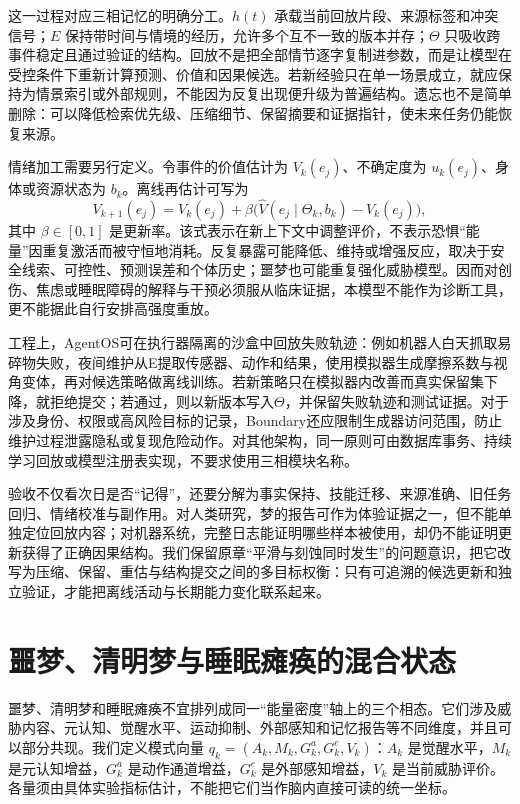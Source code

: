这一过程对应三相记忆的明确分工。$h(t)$ 承载当前回放片段、来源标签和冲突信号；$E$ 保持带时间与情境的经历，允许多个互不一致的版本并存；$\Theta$ 只吸收跨事件稳定且通过验证的结构。回放不是把全部情节逐字复制进参数，而是让模型在受控条件下重新计算预测、价值和因果候选。若新经验只在单一场景成立，就应保持为情景索引或外部规则，不能因为反复出现便升级为普遍结构。遗忘也不是简单删除：可以降低检索优先级、压缩细节、保留摘要和证据指针，使未来任务仍能恢复来源。

情绪加工需要另行定义。令事件的价值估计为 $V_k(e_j)$、不确定度为 $u_k(e_j)$、身体或资源状态为 $b_k$。离线再估计可写为
\[
V_{k+1}(e_j)=V_k(e_j)+\beta\bigl(\widehat V(e_j\mid \Theta_k,b_k)-V_k(e_j)\bigr),
\]
其中 $\beta\in[0,1]$ 是更新率。该式表示在新上下文中调整评价，不表示恐惧“能量”因重复激活而被守恒地消耗。反复暴露可能降低、维持或增强反应，取决于安全线索、可控性、预测误差和个体历史；噩梦也可能重复强化威胁模型。因而对创伤、焦虑或睡眠障碍的解释与干预必须服从临床证据，本模型不能作为诊断工具，更不能据此自行安排高强度重放。

工程上，AgentOS可在执行器隔离的沙盒中回放失败轨迹：例如机器人白天抓取易碎物失败，夜间维护从E提取传感器、动作和结果，使用模拟器生成摩擦系数与视角变体，再对候选策略做离线训练。若新策略只在模拟器内改善而真实保留集下降，就拒绝提交；若通过，则以新版本写入$\Theta$，并保留失败轨迹和测试证据。对于涉及身份、权限或高风险目标的记录，Boundary还应限制生成器访问范围，防止维护过程泄露隐私或复现危险动作。对其他架构，同一原则可由数据库事务、持续学习回放或模型注册表实现，不要求使用三相模块名称。

验收不仅看次日是否“记得”，还要分解为事实保持、技能迁移、来源准确、旧任务回归、情绪校准与副作用。对人类研究，梦的报告可作为体验证据之一，但不能单独定位回放内容；对机器系统，完整日志能证明哪些样本被使用，却仍不能证明更新获得了正确因果结构。我们保留原章“平滑与刻蚀同时发生”的问题意识，把它改写为压缩、保留、重估与结构提交之间的多目标权衡：只有可追溯的候选更新和独立验证，才能把离线活动与长期能力变化联系起来。

\section{噩梦、清明梦与睡眠瘫痪的混合状态}
\label{sec:section_4147}
噩梦、清明梦和睡眠瘫痪不宜排列成同一“能量密度”轴上的三个相态。它们涉及威胁内容、元认知、觉醒水平、运动抑制、外部感知和记忆报告等不同维度，并且可以部分共现。我们定义模式向量 $q_k=(A_k,M_k,G^a_k,G^e_k,V_k)$：$A_k$ 是觉醒水平，$M_k$ 是元认知增益，$G^a_k$ 是动作通道增益，$G^e_k$ 是外部感知增益，$V_k$ 是当前威胁评价。各量须由具体实验指标估计，不能把它们当作脑内直接可读的统一坐标。


